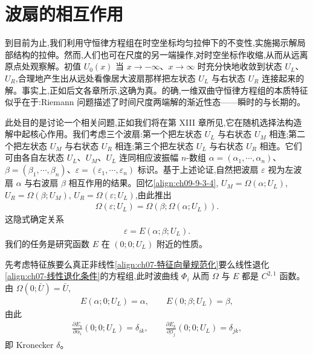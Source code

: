 \documentclass[../../main.tex]{subfiles}
\begin{document}
\section{波扇的相互作用}\label{section:ch09-波扇的相互作用}

到目前为止,我们利用守恒律方程组在时空坐标均匀拉伸下的不变性,实施揭示解局部结构的拉伸。然而,人们也可在尺度的另一端操作,对时空坐标作收缩,从而从远离原点处观察解。初值 $U_{0}(x)$ 当 $x\to-\infty$、$x\to\infty$ 时充分快地收敛到状态 $U_{L}$、$U_{R}$,合理地产生出从远处看像居大波扇那样把左状态 $U_{L}$ 与右状态 $U_{R}$ 连接起来的解。事实上,正如后文各章所示,这确为真。的确,一维双曲守恒律方程组的本质特征似乎在于:Riemann 问题描述了时间尺度两端解的渐近性态——瞬时的与长期的。

此处目的是讨论一个相关问题,正如我们将在第 XIII 章所见,它在随机选择法构造解中起核心作用。我们考虑三个波扇:第一个把左状态 $U_{L}$ 与右状态 $U_{M}$ 相连;第二个把左状态 $U_{M}$ 与右状态 $U_{R}$ 相连;第三个把左状态 $U_{L}$ 与右状态 $U_{R}$ 相连。它们可由各自左状态 $U_{L}$、$U_{M}$、$U_{L}$ 连同相应波振幅 $n$-数组 $\alpha=(\alpha_{1},\cdots ,\alpha_{n})$、$\beta=(\beta_{1},\cdots ,\beta_{n})$、$\varepsilon=(\varepsilon_{1},\cdots ,\varepsilon_{n})$ 标识。基于上述论证,自然把波扇 $\varepsilon$ 视为左波扇 $\alpha$ 与右波扇 $\beta$ 相互作用的结果。回忆\eqref{align:ch09-9-3-4}, $U_{M}=\Omega(\alpha;U_{L})$, $U_{R}=\Omega(\beta;U_{M})$, $U_{R}=\Omega(\varepsilon;U_{L})$,由此推出
\begin{align}
\Omega(\varepsilon;U_{L})=\Omega(\beta;\Omega(\alpha;U_{L})).
\label{align:ch09-9-9-1}
\end{align}
这隐式确定关系
\begin{align}
\varepsilon=E(\alpha;\beta;U_{L}).
\label{align:ch09-9-9-2}
\end{align}
我们的任务是研究函数 $E$ 在 $(0;0;U_{L})$ 附近的性质。

先考虑特征族要么真正非线性\eqref{align:ch07-特征向量规范化}要么线性退化\eqref{align:ch07-线性退化条件}的方程组,此时波曲线 $\Phi_{i}$ 从而 $\Omega$ 与 $E$ 都是 $C^{2,1}$ 函数。由 $\Omega(0;\bar{U})=\bar{U}$,
\begin{align}
E(\alpha;0;U_{L})=\alpha,\qquad E(0;\beta;U_{L})=\beta,
\label{align:ch09-9-9-3}
\end{align}
由此
\begin{align}
\frac{\partial E_{k}}{\partial\alpha_{i}}(0;0;U_{L})=\delta_{ik},\qquad\frac{\partial E_{k}}{\partial\beta_{j}}(0;0;U_{L})=\delta_{jk},
\label{align:ch09-9-9-4}
\end{align}
即 Kronecker $\delta$。
\end{document}
